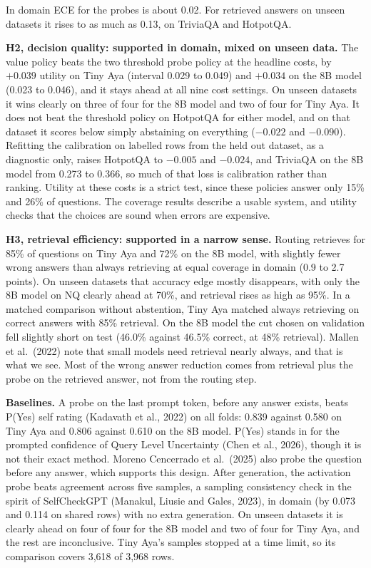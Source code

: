 \documentclass[11pt,a4paper]{article}
\begin{document}
In domain ECE for the probes is about 0.02. For retrieved answers on unseen datasets it rises to as much as 0.13, on TriviaQA and HotpotQA.

\textbf{H2, decision quality: supported in domain, mixed on unseen data.} The value policy beats the two threshold probe policy at the headline costs, by $+0.039$ utility on Tiny Aya (interval 0.029 to 0.049) and $+0.034$ on the 8B model (0.023 to 0.046), and it stays ahead at all nine cost settings. On unseen datasets it wins clearly on three of four for the 8B model and two of four for Tiny Aya. It does not beat the threshold policy on HotpotQA for either model, and on that dataset it scores below simply abstaining on everything ($-0.022$ and $-0.090$). Refitting the calibration on labelled rows from the held out dataset, as a diagnostic only, raises HotpotQA to $-0.005$ and $-0.024$, and TriviaQA on the 8B model from 0.273 to 0.366, so much of that loss is calibration rather than ranking. Utility at these costs is a strict test, since these policies answer only 15\% and 26\% of questions. The coverage results describe a usable system, and utility checks that the choices are sound when errors are expensive.

\textbf{H3, retrieval efficiency: supported in a narrow sense.} Routing retrieves for 85\% of questions on Tiny Aya and 72\% on the 8B model, with slightly fewer wrong answers than always retrieving at equal coverage in domain (0.9 to 2.7 points). On unseen datasets that accuracy edge mostly disappears, with only the 8B model on NQ clearly ahead at 70\%, and retrieval rises as high as 95\%. In a matched comparison without abstention, Tiny Aya matched always retrieving on correct answers with 85\% retrieval. On the 8B model the cut chosen on validation fell slightly short on test (46.0\% against 46.5\% correct, at 48\% retrieval). Mallen et al.\ (2022) note that small models need retrieval nearly always, and that is what we see. Most of the wrong answer reduction comes from retrieval plus the probe on the retrieved answer, not from the routing step.

\textbf{Baselines.} A probe on the last prompt token, before any answer exists, beats P(Yes) self rating (Kadavath et al., 2022) on all folds: 0.839 against 0.580 on Tiny Aya and 0.806 against 0.610 on the 8B model. P(Yes) stands in for the prompted confidence of Query Level Uncertainty (Chen et al., 2026), though it is not their exact method. Moreno Cencerrado et al.\ (2025) also probe the question before any answer, which supports this design. After generation, the activation probe beats agreement across five samples, a sampling consistency check in the spirit of SelfCheckGPT (Manakul, Liusie and Gales, 2023), in domain (by 0.073 and 0.114 on shared rows) with no extra generation. On unseen datasets it is clearly ahead on four of four for the 8B model and two of four for Tiny Aya, and the rest are inconclusive. Tiny Aya's samples stopped at a time limit, so its comparison covers 3,618 of 3,968 rows.
\end{document}

